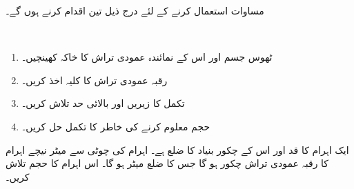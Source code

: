 مساوات  استعمال کرنے کے لئے درج ذیل تین اقدام کرنے ہوں گے۔

\\
\begin{enumerate}[1.]
\item
ٹھوس جسم  اور اس کے نمائندہ عمودی تراش کا خاکہ کھینچیں۔
\item
 رقبہ عمودی تراش  کا کلیہ اخذ کریں۔
\item
تکمل کا زیریں اور بالائی حد تلاش کریں۔
\item
حجم معلوم کرنے کی خاطر  کا تکمل حل کریں۔
\end{enumerate}

ایک اہرام کا قد  اور اس کے چکور بنیاد کا ضلع  ہے۔ اہرام کی چوٹی سے  میٹر نیچے اہرام کا رقبہ عمودی تراش چکور ہو گا جس کا ضلع  میٹر ہو گا۔ اس اہرام کا حجم تلاش کریں۔


